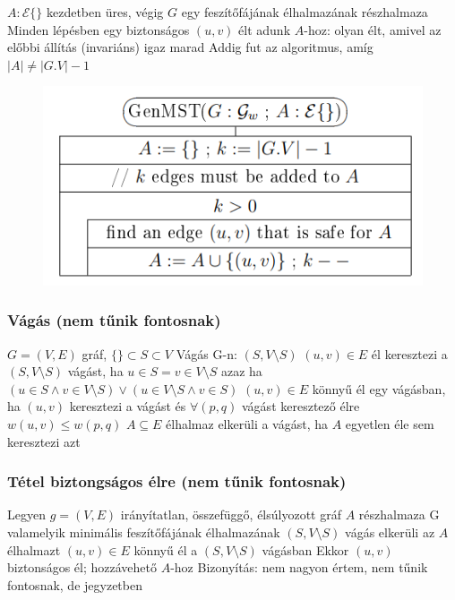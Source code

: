 \documentclass[12pt,a4paper]{article}
\begin{document}
\begin{outline}
	\1 $A:\mathcal{E}\{\}$ kezdetben üres, végig $G$ egy feszítőfájának élhalmazának részhalmaza
	\1 Minden lépésben egy biztonságos $(u,v)$ élt adunk $A$-hoz: olyan élt, amivel az előbbi állítás (invariáns) igaz marad
	\1 Addig fut az algoritmus, amíg $|A| \ne |G.V|-1$
\end{outline}

\begin{figure}[h!]
	\centering
	\includegraphics[width=0.65\linewidth]{GenMST}
\end{figure}

\pagebreak

\subsubsection{Vágás (nem tűnik fontosnak)}

\begin{outline}
	\1 $G=(V,E)$ gráf, $\{\} \subset S \subset V$
	\1 Vágás G-n: $(S, V \setminus S)$
	\1 $(u,v) \in E$ él keresztezi a $(S, V \setminus S)$ vágást, ha $u \in S = v \in V \setminus S$
		\2 azaz ha $(u \in S \wedge v \in V \setminus S) \lor (u \in V \setminus S \wedge v \in S)$
	\1 $(u,v) \in E$ könnyű él egy vágásban, ha
		\2 $(u,v)$ keresztezi a vágást
		\2 és $\forall(p,q)$ vágást keresztező élre $w(u,v) \le w(p,q)$
	\1 $A \subseteq E$ élhalmaz elkerüli a vágást, ha $A$ egyetlen éle sem keresztezi azt
\end{outline}

\subsubsection{Tétel biztongságos élre (nem tűnik fontosnak)}

\begin{outline}
	\1 Legyen $g=(V,E)$ irányítatlan, összefüggő, élsúlyozott gráf
	\1 $A$ részhalmaza G valamelyik minimális feszítőfájának élhalmazának
	\1 $(S,V \setminus S)$ vágás elkerüli az $A$ élhalmazt
	\1 $(u,v) \in E$ könnyű él a $(S,V \setminus S)$ vágásban
	\1 Ekkor $(u,v)$ biztonságos él; hozzávehető $A$-hoz
	\1 Bizonyítás: nem nagyon értem, nem tűnik fontosnak, de jegyzetben
\end{outline}
\end{document}
